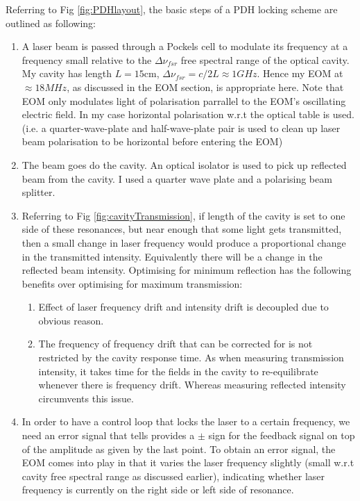 \documentclass[12pt]{report}
\begin{document}
Referring to Fig \ref{fig:PDHlayout}, the basic steps of a PDH locking scheme are outlined as following: 
\begin{enumerate}
    \item A laser beam is passed through a Pockels cell to modulate its frequency at a frequency small relative to the $\Delta \nu_{fsr}$ free spectral range of the optical cavity. My cavity has length $L=15$cm, $\Delta \nu_{fsr} = c/2L \approx 1GHz$. Hence my EOM at $\approx 18 MHz$, as discussed in the EOM section, is appropriate here. Note that EOM only modulates light of polarisation parrallel to the EOM's oscillating electric field. In my case horizontal polarisation w.r.t the optical table is used. (i.e. a quarter-wave-plate and half-wave-plate pair is used to clean up laser beam polarisation to be horizontal before entering the EOM) 

    \item The beam goes do the cavity. An optical isolator is used to pick up reflected beam from the cavity. I used a quarter wave plate and a polarising beam splitter. 

    \item Referring to Fig \ref{fig:cavityTransmission}, if length of the cavity is set to one side of these resonances, but near enough that some light gets transmitted, then a small change in laser frequency would produce a proportional change in the transmitted intensity. Equivalently there will be a change in the reflected beam intensity. Optimising for minimum reflection has the following benefits over optimising for maximum transmission: 
    \begin{enumerate}
        \item Effect of laser frequency drift and intensity drift is decoupled due to obvious reason.
        \item The frequency of frequency drift that can be corrected for is not restricted by the cavity response time. As when measuring transmission intensity, it takes time for the fields in the cavity to re-equilibrate whenever there is frequency drift. Whereas measuring reflected intensity circumvents this issue. 
    \end{enumerate}

    \item In order to have a control loop that locks the laser to a certain frequency, we need an error signal that tells provides a $\pm$ sign for the feedback signal on top of the amplitude as given by the last point. To obtain an error signal, the EOM comes into play in that it varies the laser frequency slightly (small w.r.t cavity free spectral range as discussed earlier), indicating whether laser frequency is currently on the right side or left side of resonance. 


\end{enumerate}
\end{document}
